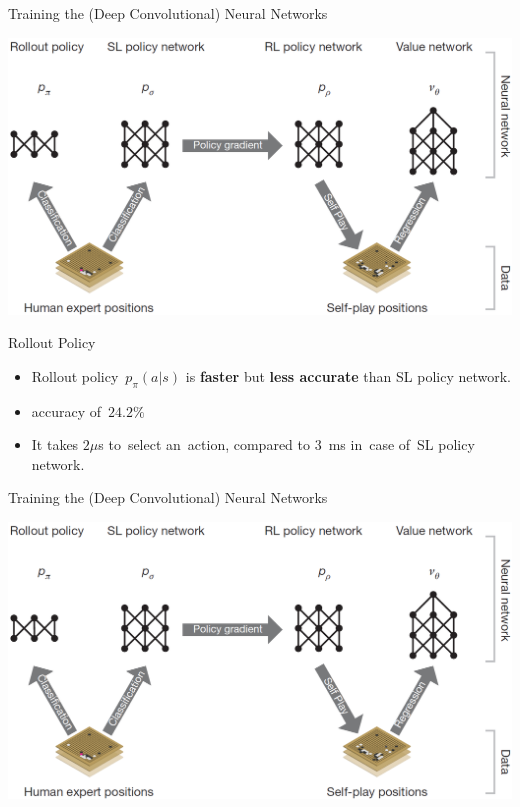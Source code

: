 \documentclass{beamer}
\begin{document}
{    \begin{frame}{Training the (Deep Convolutional) Neural Networks}
      \begin{center}
        \includegraphics[width=\textwidth]{../img/neural_nets_pipeline.png}
      \end{center}
    \end{frame}

    \begin{frame}{Rollout Policy}
      \begin{itemize}[<+- | alert@+>]
        \item Rollout policy~$p_\pi(a|s)$ is \textbf{faster} but \textbf{less accurate} than SL policy network.
        \item accuracy of~$24.2\%$
        \item It takes $2 \mu$s to~select an~action, compared to $3$~ms in~case of~SL policy network.
      \end{itemize}
    \end{frame}

    \begin{frame}{Training the (Deep Convolutional) Neural Networks}
      \begin{center}
        \includegraphics[width=\textwidth]{../img/neural_nets_pipeline.png}
      \end{center}
    \end{frame}

}
\end{document}
